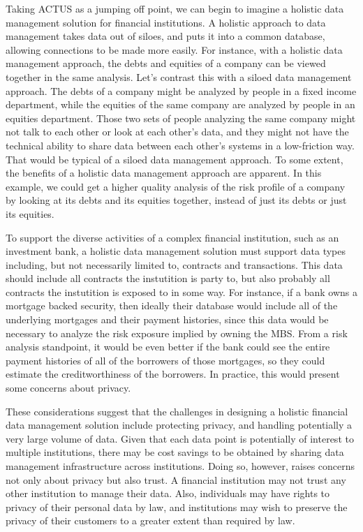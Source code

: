 \documentclass[11pt]{article}
\begin{document}
Taking ACTUS as a jumping off point, we can begin to imagine a holistic data
management solution for financial institutions. A holistic approach to data
management takes data out of siloes, and puts it into a common database, allowing
connections to be made more easily. For instance, with a holistic data management
approach, the debts and equities of a company can be viewed together in the same
analysis. Let's contrast this with a siloed data management approach.
The debts of a company might be
analyzed by people in a fixed income department, while the equities of the same
company are analyzed by people in an equities department. Those two sets of
people analyzing the same company might not talk to each other or look at each
other's data, and they might not have the technical ability to share data
between each other's systems in a low-friction way. That would be typical of a
siloed data management approach. To some extent, the benefits of a holistic
data management approach are apparent. In this example, we could get a higher
quality analysis of the risk profile of a company by looking at its debts
and its equities together, instead of just its debts or just its equities.

To support the diverse activities of a complex financial institution, such
as an investment bank, a holistic data management solution must support data
types including, but not necessarily limited to, contracts and transactions.
This data should include all contracts the instutition is party to, but also
probably all contracts the instutition is exposed to in some way. For instance,
if a bank owns a mortgage backed security, then ideally their database would
include all of the underlying mortgages and their payment histories, since this
data would be necessary to analyze the risk exposure implied by owning the MBS.
From a risk analysis standpoint, it would be even better if the bank could see
the entire payment histories of all of the borrowers of those mortgages, so they
could estimate the creditworthiness of the borrowers. In practice, this would
present some concerns about privacy.

These considerations suggest that the challenges in designing a holistic financial
data management solution include protecting privacy, and handling potentially
a very large volume of data. Given that each data point is potentially of interest
to multiple institutions, there may be cost savings to be obtained by sharing
data management infrastructure across institutions. Doing so, however, raises
concerns not only about privacy but also trust. A financial institution may not
trust any other institution to manage their data. Also, individuals may have
rights to privacy of their personal data by law, and institutions may wish to
preserve the privacy of their customers to a greater extent than required by law.
\end{document}
